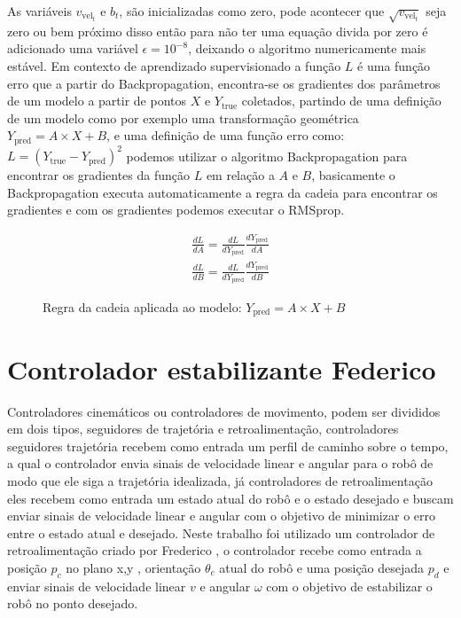 As variáveis $v_{\text{vel}_t}$ e  $b_t$, são inicializadas como zero, pode acontecer
que  $\sqrt{v_{\text{vel}_t}}$ seja zero ou bem próximo disso então para não ter uma equação
divida por zero é adicionado uma variável $\epsilon =10^{-8}$, deixando o algoritmo numericamente
mais estável. Em contexto de aprendizado supervisionado a função $L$ é uma função erro que a
partir do Backpropagation, encontra-se os gradientes dos parâmetros de um modelo a partir
de pontos $X$ e $Y_{\text{true}}$ coletados, partindo de  uma definição de um modelo como por exemplo uma
transformação geométrica $Y_{\text{pred}}= A \times X + B$, e uma definição de uma função
erro como: $L=(Y_{\text{true}}- Y_{\text{pred}})^2$ podemos utilizar o algoritmo
Backpropagation para encontrar os gradientes da função $L$ em relação a $A$
e  $B$, basicamente o Backpropagation executa automaticamente a regra da cadeia
para encontrar os gradientes e com os gradientes podemos executar o RMSprop.

\begin{figure}[H]
    \begin{align*}
        \frac{dL}{dA } = \frac{dL}{dY_{\text{pred}} } \frac{dY_{\text{pred}}}{dA}  \\
        \frac{dL}{dB } = \frac{dL}{dY_{\text{pred}} } \frac{dY_{\text{pred}}}{dB} 
    \end{align*}
    \caption{Regra da cadeia aplicada ao modelo: $Y_{\text{pred}}= A \times X + B$ }
\end{figure}



\section{Controlador estabilizante Federico}
Controladores cinemáticos ou controladores de movimento, podem ser 
divididos em dois tipos, seguidores de trajetória e retroalimentação,
controladores seguidores trajetória recebem como entrada um perfil
de caminho sobre o tempo, a qual o controlador envia sinais de
velocidade linear e angular para o robô de modo que ele siga a
trajetória idealizada, já controladores de retroalimentação
eles recebem como entrada um estado atual do robô e o estado desejado
e buscam enviar sinais de velocidade linear e angular com o objetivo
de minimizar o erro entre o estado atual e desejado. Neste trabalho
foi utilizado um controlador de retroalimentação criado por Frederico
\cite{vieira2006controle}, o controlador recebe como entrada a posição
$p_c$  no plano x,y , orientação $\theta_c$ atual do robô e uma posição desejada $p_d$
e enviar sinais de velocidade linear $v$ e angular $\omega$ com o
objetivo de estabilizar o robô no ponto desejado.

